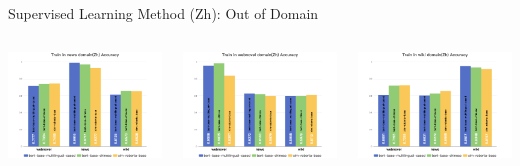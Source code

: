 \documentclass[serif]{beamer}
\begin{document}
\begin{frame}{Supervised Learning Method (Zh): Out of Domain}
\begin{columns}[t]
    \centering
    \includegraphics[width=\linewidth]{images/Train in news domain(Zh) Accuracy.png}

    \centering
    \includegraphics[width=\linewidth]{images/Train in webnovel domain(Zh) Accuracy.png}

    \centering
    \includegraphics[width=\linewidth]{images/Train in wiki domain(Zh) Accuracy.png}
\end{columns}


\end{frame}
\end{document}
